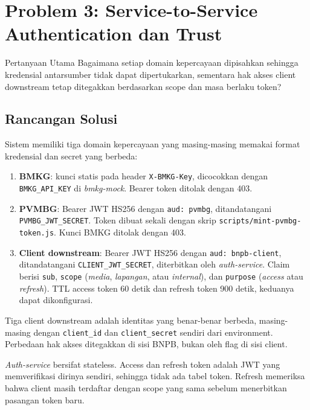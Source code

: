 \section{Problem 3: Service-to-Service Authentication dan Trust}
\begin{infobox}{Pertanyaan Utama}
Bagaimana setiap domain kepercayaan dipisahkan sehingga kredensial antarsumber
tidak dapat dipertukarkan, sementara hak akses client downstream tetap
ditegakkan berdasarkan scope dan masa berlaku token?
\end{infobox}

\subsection{Rancangan Solusi}
Sistem memiliki tiga domain kepercayaan yang masing-masing memakai format
kredensial dan secret yang berbeda:

\begin{enumerate}
  \item \textbf{BMKG}: kunci statis pada header \texttt{X-BMKG-Key}, dicocokkan
  dengan \texttt{BMKG\_API\_KEY} di \textit{bmkg-mock}. Bearer token ditolak dengan 403.
  \item \textbf{PVMBG}: Bearer JWT HS256 dengan \texttt{aud: pvmbg}, ditandatangani
  \texttt{PVMBG\_JWT\_SECRET}. Token dibuat sekali dengan skrip
  \texttt{scripts/mint-pvmbg-token.js}. Kunci BMKG ditolak dengan 403.
  \item \textbf{Client downstream}: Bearer JWT HS256 dengan \texttt{aud: bnpb-client},
  ditandatangani \texttt{CLIENT\_JWT\_SECRET}, diterbitkan oleh \textit{auth-service}.
  Claim berisi \texttt{sub}, \texttt{scope} (\textit{media}, \textit{lapangan}, atau
  \textit{internal}), dan \texttt{purpose} (\textit{access} atau \textit{refresh}).
  TTL access token 60 detik dan refresh token 900 detik, keduanya dapat dikonfigurasi.
\end{enumerate}

Tiga client downstream adalah identitas yang benar-benar berbeda, masing-masing
dengan \texttt{client\_id} dan \texttt{client\_secret} sendiri dari environment.
Perbedaan hak akses ditegakkan di sisi BNPB, bukan oleh flag di sisi client.

\textit{Auth-service} bersifat stateless. Access dan refresh token adalah JWT yang
memverifikasi dirinya sendiri, sehingga tidak ada tabel token. Refresh memeriksa
bahwa client masih terdaftar dengan scope yang sama sebelum menerbitkan pasangan
token baru.

